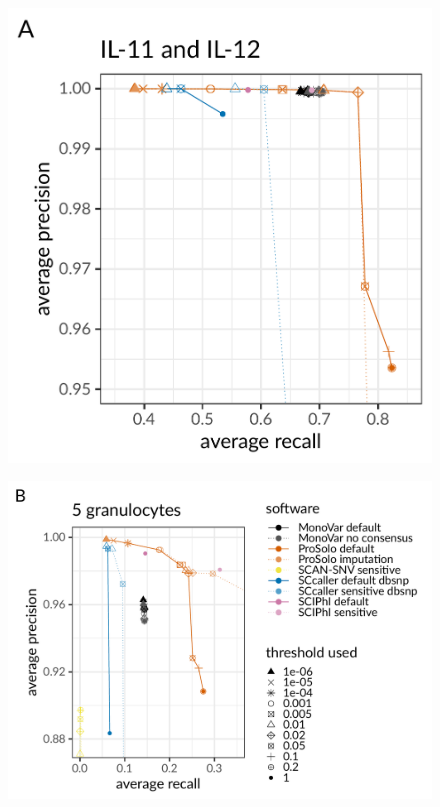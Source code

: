 \documentclass[fleqn,12pt,inline]{wlscirep}
\begin{document}
\begin{figure}[!tpb]
 \begin{minipage}{.40\linewidth}
  \includegraphics[height=45ex]{figs/Dong2017/Dong2017_prosolo-monovar-scansnv-sccaller_precision-recall-plot_focus-tools.pdf} \\
 \end{minipage}
 \begin{minipage}{.55\linewidth}
  \includegraphics[height=45ex]{figs/Laehnemann2017/Laehnemann2017_prosolo-monovar-scansnv-sccaller-sciphi_precision-recall-plot_focus-top-left.pdf} \\
 \end{minipage}


\end{figure}
\end{document}
